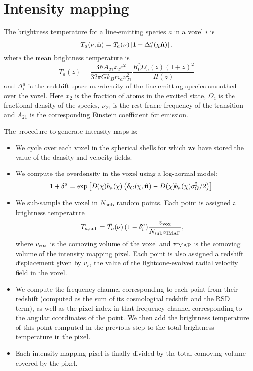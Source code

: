 \documentclass[a4paper,10pt]{article}
\begin{document}
\section{Intensity mapping}
  The brightness temperature for a line-emitting species $a$ in a voxel $i$ is
  \begin{equation}
    T_a(\nu,\hat{\bf n})=\bar{T}_a(\nu)\left[1+\Delta^a_i(\chi\hat{\bf n})\right].
  \end{equation}
  where the mean brightness temperature is
  \begin{equation}
    \bar{T}_a(z)=\frac{3\hbar A_{21} x_2 c^2}{32\pi G k_B m_a \nu_{21}^2}
    \frac{H_0^2\Omega_{a}(z)(1+z)^2}{H(z)}
  \end{equation}
  and $\Delta^a_i$ is the redshift-space overdensity of the line-emitting species
  smoothed over the voxel. Here $x_2$ is the fraction of atoms in the excited state,
  $\Omega_a$ is the fractional density of the species, $\nu_{21}$ is the rest-frame
  frequency of the transition and $A_{21}$ is the corresponding Einstein coefficient
  for emission.

  The procedure to generate intensity maps is:
  \begin{itemize}
    \item We cycle over each voxel in the spherical shells for which we have stored
      the value of the density and velocity fields.
    \item We compute the overdensity in the voxel using a log-normal model:
      \begin{equation}
        1+\delta^a=
        \exp\left[D(\chi)b_a(\chi)\left(\delta_G(\chi,\hat{\bf n})-
          D(\chi)b_a(\chi)\sigma_G^2/2\right)\right].
      \end{equation}
    \item We sub-sample the voxel in $N_{\rm sub}$ random points. Each point is
      assigned a brightness temperature
      \begin{equation}
        T_{a,{\rm sub}}=\bar{T_a}(\nu)\,(1+\delta^a_i)\frac{v_{\rm vox}}{N_{\rm sub}v_{\rm IMAP}},
      \end{equation}
      where $v_{\rm vox}$ is the comoving volume of the voxel and $v_{\rm IMAP}$ is the
      comoving volume of the intensity mapping pixel. Each point is also assigned a redshift
      displacement given by $v_r$, the value of the lightcone-evolved radial velocity
      field in the voxel.
    \item We compute the frequency channel corresponding to each point from their
      redshift (computed as the sum of its cosmological redshift and the RSD term),
      as well as the pixel index in that frequency channel corresponding to the
      angular coordinates of the point. We then add the brightness temperature of
      this point computed in the previous step to the total brightness temperature
      in the pixel.
    \item Each intensity mapping pixel is finally divided by the total comoving
      volume covered by the pixel.
  \end{itemize}
  
\end{document}
